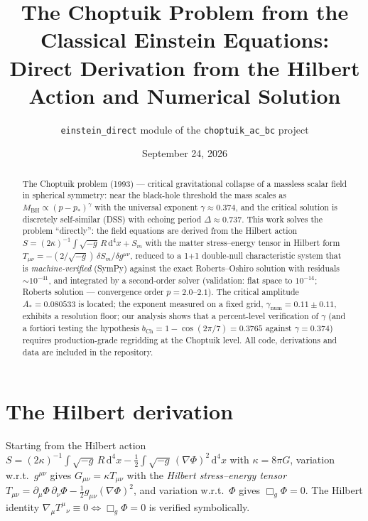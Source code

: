 \documentclass[11pt,a4paper]{article}
\title{\bfseries The Choptuik Problem from the Classical Einstein Equations:\\
Direct Derivation from the Hilbert Action and Numerical Solution}
\author{\texttt{einstein\_direct} module of the \texttt{choptuik\_ac\_bc} project}
\date{September 24, 2026}
\begin{document}
\maketitle

\begin{abstract}
The Choptuik problem (1993) --- critical gravitational collapse of a massless
scalar field in spherical symmetry: near the black-hole threshold the mass
scales as $M_{\mathrm{BH}}\propto(p-p_*)^{\gamma}$ with the universal exponent
$\gamma\approx0.374$, and the critical solution is discretely self-similar
(DSS) with echoing period $\Delta\approx0.737$. This work solves the problem
``directly'': the field equations are derived from the Hilbert action
$S=(2\kappa)^{-1}\!\int\!\sqrt{-g}\,R\,\mathrm{d}^4x+S_m$ with the matter
stress--energy tensor in Hilbert form
$T_{\mu\nu}=-(2/\sqrt{-g})\,\delta S_m/\delta g^{\mu\nu}$, reduced to a 1+1
double-null characteristic system that is \emph{machine-verified} (SymPy)
against the exact Roberts--Oshiro solution with residuals $\sim10^{-41}$, and
integrated by a second-order solver (validation: flat space to $10^{-14}$;
Roberts solution --- convergence order $p=2.0$--$2.1$). The critical amplitude
$A_*=0.080533$ is located; the exponent measured on a fixed grid,
$\gamma_{\text{num}}=0.11\pm0.11$, exhibits a resolution floor; our analysis
shows that a percent-level verification of $\gamma$ (and a fortiori testing
the hypothesis $b_{\mathrm{Ch}}=1-\cos(2\pi/7)=0.3765$ against
$\gamma=0.374$) requires production-grade regridding at the Choptuik level.
All code, derivations and data are included in the repository.
\end{abstract}

\section{The Hilbert derivation}
Starting from the Hilbert action
$S=(2\kappa)^{-1}\int\sqrt{-g}\,R\,\mathrm{d}^4x
-\tfrac12\int\sqrt{-g}\,(\nabla\Phi)^2\,\mathrm{d}^4x$
with $\kappa=8\pi G$, variation w.r.t.\
$g^{\mu\nu}$ gives $G_{\mu\nu}=\kappa T_{\mu\nu}$ with the \emph{Hilbert
stress--energy tensor}
$T_{\mu\nu}=\partial_\mu\Phi\,\partial_\nu\Phi-\tfrac12 g_{\mu\nu}(\nabla\Phi)^2$,
and variation w.r.t.\ $\Phi$ gives $\Box_g\Phi=0$. The Hilbert identity
$\nabla_\mu T^\mu{}_\nu\equiv0\Leftrightarrow\Box_g\Phi=0$ is verified
symbolically.
\end{document}
